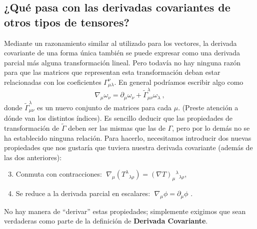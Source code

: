 \documentclass[11pt,b5paper,openany,twoside]{book}
\newcommand{\p}[1]{{\partial_{#1}}}
\begin{document}
\subsection{¿Qué pasa con las derivadas covariantes de otros tipos de tensores?}
Mediante un razonamiento similar al utilizado para los vectores, la derivada covariante de una forma única también se puede expresar como una derivada parcial más alguna transformación lineal.
Pero todavía no hay ninguna razón para que las matrices que representan esta transformación deban estar relacionadas con los coeficientes $\Gamma^\nu_{\mu\lambda}$.
En general podríamos escribir algo como
\begin{equation}
\nabla_\mu \omega_\nu = \partial_\mu \omega_\nu +
\widetilde{\Gamma}^\lambda_{\mu\nu}
\omega_\lambda\ ,\label{3.7}
\end{equation}
donde $\widetilde{\Gamma}^\lambda_{\mu\nu}$ es un nuevo conjunto de matrices para cada $\mu$.
(Preste atención a dónde van los distintos índices).
Es sencillo deducir que las propiedades de transformación de $\widetilde{\Gamma}$ deben ser las mismas que las de $\Gamma$, pero por lo demás no se ha establecido ninguna relación.
Para hacerlo, necesitamos introducir dos nuevas propiedades que nos gustaría que tuviera nuestra derivada covariante (además de las dos anteriores):

\begin{enumerate}
\setcounter{enumi}{2}
\item Conmuta con contracciones: $\;\nabla_\mu(T^\lambda{}_{\lambda\rho}) =(\nabla T)_\mu{}^\lambda{}_{\lambda\rho}$,
\item Se reduce a la derivada parcial en escalares: $\;\nabla_\mu\phi =\p\mu\phi$ .
\end{enumerate}

\noindent
No hay manera de ``derivar'' estas propiedades; simplemente exigimos que sean verdaderas como parte de la definición de \textbf{Derivada Covariante}.
\end{document}
